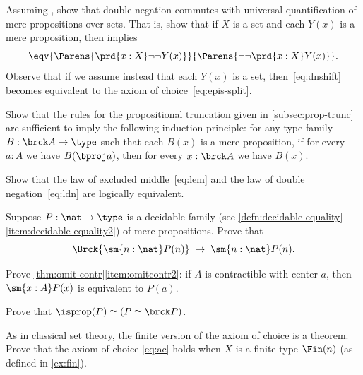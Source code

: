 \begin{ex}\label{ex:lem-impl-dn-commutes}
  Assuming \LEM{}, show that double negation commutes with universal quantification of mere propositions over sets.
  That is, show that if $X$ is a set and each $Y(x)$ is a mere proposition, then \LEM{} implies
  \begin{equation}
    \eqv{\Parens{\prd{x:X} \neg\neg Y(x)}}{\Parens{\neg\neg \prd{x:X} Y(x)}}.\label{eq:dnshift}
  \end{equation}
  Observe that if we assume instead that each $Y(x)$ is a set, then~\eqref{eq:dnshift} becomes equivalent to the axiom of choice~\eqref{eq:epis-split}.
\end{ex}

\begin{ex}\label{ex:prop-trunc-ind}
  Show that the rules for the propositional truncation given in \cref{subsec:prop-trunc} are sufficient to imply the following induction principle: for any type family $B:\brck A \to \type$ such that each $B(x)$ is a mere proposition, if for every $a:A$ we have $B(\bproj a)$, then for every $x:\brck A$ we have $B(x)$.
\end{ex}

\begin{ex}\label{ex:lem-ldn}
  Show that the law of excluded middle~\eqref{eq:lem} and the law of double negation~\eqref{eq:ldn} are logically equivalent.
\end{ex}

\begin{ex}\label{ex:decidable-choice}
  Suppose $P:\nat\to\type$ is a decidable family (see \cref{defn:decidable-equality}\ref{item:decidable-equality2}) of mere propositions.
  Prove that
  \[ \Brck{\sm{n:\nat} P(n)} \;\to\; \sm{n:\nat}P(n).\]
\end{ex}

\begin{ex}\label{ex:omit-contr2}
  Prove \cref{thm:omit-contr}\ref{item:omitcontr2}: if $A$ is contractible with center $a$, then $\sm{x:A} P(x)$ is equivalent to $P(a)$.
\end{ex}

\begin{ex}\label{ex:isprop-equiv-equiv-bracket}
  Prove that $\isprop(P) \simeq (P \simeq \brck P)$.
\end{ex}

\begin{ex}\label{ex:finite-choice}
  As in classical set theory, the finite version of the axiom of choice is a theorem.  Prove that the axiom of choice \eqref{eq:ac} holds when $X$ is a finite type $\Fin(n)$ (as defined in \cref{ex:fin}).
\end{ex}

